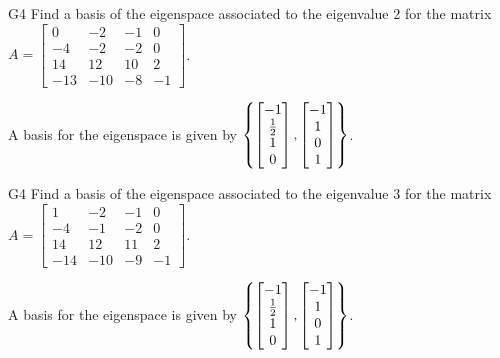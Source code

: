 \begin{problem}{G4}
Find a basis of the eigenspace associated to the eigenvalue $2$ for the matrix $A=\begin{bmatrix}0 & -2 & -1 & 0 \\ -4 & -2 & -2 & 0 \\ 14 & 12 & 10 & 2 \\ -13 & -10 & -8 & -1 \end{bmatrix}$.
\end{problem}
\begin{solution}
A basis for the eigenspace is given by $\left\{\begin{bmatrix} -1 \\ \frac{1}{2} \\ 1 \\ 0 \end{bmatrix},\begin{bmatrix} -1 \\ 1 \\ 0 \\ 1 \end{bmatrix}\right\}$.
\end{solution}

\begin{problem}{G4}
Find a basis of the eigenspace associated to the eigenvalue $3$ for the matrix $A=\begin{bmatrix}1 & -2 & -1 & 0 \\ -4 & -1 & -2 & 0 \\ 14 & 12 & 11 & 2 \\ -14 & -10 & -9 & -1\end{bmatrix}$.
\end{problem}
\begin{solution}
A basis for the eigenspace is given by $\left\{\begin{bmatrix} -1 \\ \frac{1}{2} \\ 1 \\ 0 \end{bmatrix},\begin{bmatrix} -1 \\ 1 \\ 0 \\ 1 \end{bmatrix}\right\}$.
\end{solution}



